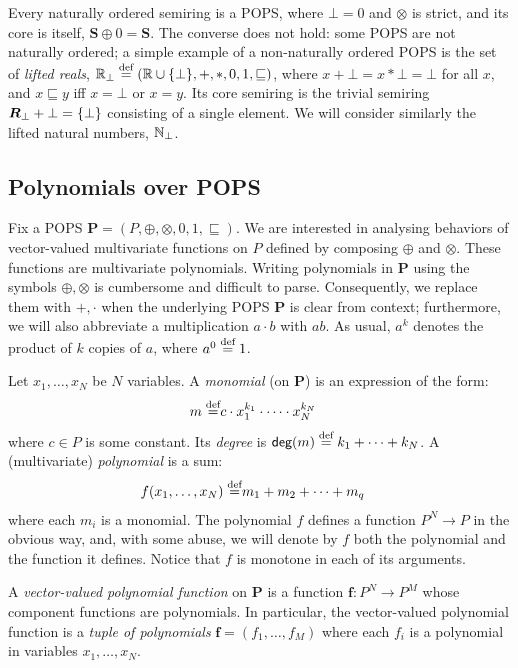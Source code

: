 Every naturally ordered semiring is a POPS, where $\bot = 0$ and
$\otimes$ is strict, and its core is itself, $\bm S \oplus 0 = \bm S$.
The converse does not hold: some POPS are not naturally ordered; a
simple example of a non-naturally ordered POPS is the set of {\em lifted
  reals},
$\mathbb R_\bot \stackrel{\text{def}}{=} (\mathbb R \cup \{\bot\}, +, *, 0, 1, \sqsubseteq)$, where
$x+\bot = x*\bot = \bot$ for all $x$, and $x \sqsubseteq y$ iff
$x = \bot$ or $x=y$.  Its core semiring is the trivial semiring
$\bm R_\bot + \bot = \{\bot\}$ consisting of a single element.  We
will consider similarly the lifted natural numbers, $\mathbb N_\bot$.

\subsection{Polynomials over POPS}
\label{subsec:polynomial}


Fix a POPS $\bm P = (P, \oplus, \otimes, 0, 1, \sqsubseteq)$.
We are interested in analysing behaviors of vector-valued multivariate functions on $P$
defined by composing $\oplus$ and $\otimes$.
These functions are multivariate polynomials.
Writing polynomials in $\bm P$ using the symbols $\oplus, \otimes$
is cumbersome and difficult to parse. Consequently, we replace them with $+, \cdot$ when the underlying
POPS $\bm P$ is clear from context; furthermore, we will also
abbreviate a multiplication $a\cdot b$ with $ab$.  As usual, $a^k$
denotes the product of $k$ copies of $a$, where $a^0 \stackrel{\text{def}}{=} 1$.

Let $x_1, \ldots, x_N$ be $N$ variables.  A {\em monomial} (on $\bm P$) is an
expression of the form:
%
\begin{align}
  m \stackrel{\text{def}}{=} & c \cdot x_1^{k_1}\cdot \cdots \cdot x_N^{k_N} \label{eq:def:monomial}
\end{align}
%
where $c \in P$ is some constant.  Its {\em degree} is
$\text{\sf deg}(m) \stackrel{\text{def}}{=} k_1+\cdots+k_N$.  A (multivariate) {\em polynomial}
is a sum:
%
\begin{align}
  f(x_1, \ldots, x_N) \stackrel{\text{def}}{=} & m_1 + m_2 + \cdots + m_q \label{eq:def:polynomial}
\end{align}
%
where each $m_i$ is a monomial.  The polynomial $f$ defines a function
$P^N \rightarrow P$ in the obvious way, and, with some abuse,
we will denote by $f$ both the polynomial and the function it defines.
Notice that $f$ is monotone in each of its arguments.

A {\em vector-valued polynomial function} on $\bm P$ is a function
$\bm f : P^N \rightarrow P^M$ whose component functions are polynomials.
In particular, the vector-valued polynomial function is a
{\em tuple of polynomials} $\bm f = (f_1, \ldots, f_M)$ where each $f_i$ is a
polynomial in variables $x_1, \ldots, x_N$.

